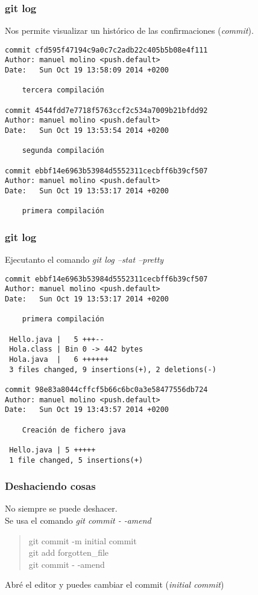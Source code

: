 \documentclass{beamer}
\begin{document}
\begin{frame}[fragile]
\frametitle{git log}
Nos permite visualizar un histórico de las confirmaciones (\emph{commit}).
\begin{tiny}
\begin{verbatim}
commit cfd595f47194c9a0c7c2adb22c405b5b08e4f111
Author: manuel molino <push.default>
Date:   Sun Oct 19 13:58:09 2014 +0200

    tercera compilación

commit 4544fdd7e7718f5763ccf2c534a7009b21bfdd92
Author: manuel molino <push.default>
Date:   Sun Oct 19 13:53:54 2014 +0200

    segunda compilación

commit ebbf14e6963b53984d5552311cecbff6b39cf507
Author: manuel molino <push.default>
Date:   Sun Oct 19 13:53:17 2014 +0200

    primera compilación

\end{verbatim}

\end{tiny}
\end{frame}

\begin{frame}[fragile]
\frametitle{git log}
Ejecutanto el comando \emph{git log --stat --pretty}
\begin{verbatim}
commit ebbf14e6963b53984d5552311cecbff6b39cf507
Author: manuel molino <push.default>
Date:   Sun Oct 19 13:53:17 2014 +0200

    primera compilación

 Hello.java |   5 +++--
 Hola.class | Bin 0 -> 442 bytes
 Hola.java  |   6 ++++++
 3 files changed, 9 insertions(+), 2 deletions(-)

commit 98e83a8044cffcf5b66c6bc0a3e58477556db724
Author: manuel molino <push.default>
Date:   Sun Oct 19 13:43:57 2014 +0200

    Creación de fichero java

 Hello.java | 5 +++++
 1 file changed, 5 insertions(+)
\end{verbatim}
\end{frame}

\begin{frame}
\frametitle{Deshaciendo cosas}
No siempre se puede deshacer.\\
 Se usa el comando \emph{git commit - -amend}
 \pause
\begin{verse}
git commit -m initial commit\\
git add forgotten\_file \\
git commit - -amend
\end{verse}
\pause
Abré el editor y puedes cambiar el commit (\emph{initial commit})
\end{frame}
\end{document}
